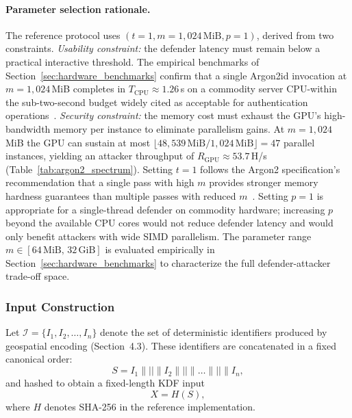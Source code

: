 \documentclass[journal,article,submit,pdftex,moreauthors]{Definitions/mdpi}
\newcommand{\add}[1]{#1}
\newcommand{\add}[1]{\added{#1}}
\begin{document}
\paragraph{Parameter selection rationale.} \add{The reference protocol uses $(t=1, m=1{,}024\,\text{MiB}, p=1)$, derived from two constraints. \emph{Usability constraint:} the defender latency must remain below a practical interactive threshold. The empirical benchmarks of Section~\ref{sec:hardware_benchmarks} confirm that a single Argon2id invocation at $m=1{,}024$\,MiB completes in $T_\text{CPU} \approx 1.26$\,s on a commodity server CPU-within the sub-two-second budget widely cited as acceptable for authentication operations~\cite{nielsen1994usability}. \emph{Security constraint:} the memory cost must exhaust the GPU's high-bandwidth memory per instance to eliminate parallelism gains. At $m=1{,}024$\,MiB the GPU can sustain at most $\lfloor 48{,}539\,\text{MiB} / 1{,}024\,\text{MiB} \rfloor = 47$ parallel instances, yielding an attacker throughput of $R_\text{GPU} \approx 53.7$\,H/s (Table~\ref{tab:argon2_spectrum}). Setting $t=1$ follows the Argon2 specification's recommendation that a single pass with high $m$ provides stronger memory hardness guarantees than multiple passes with reduced $m$~\cite{7467361}. Setting $p=1$ is appropriate for a single-thread defender on commodity hardware; increasing $p$ beyond the available CPU cores would not reduce defender latency and would only benefit attackers with wide SIMD parallelism. The parameter range $m \in [64\,\text{MiB},\, 32\,\text{GiB}]$ is evaluated empirically in Section~\ref{sec:hardware_benchmarks} to characterize the full defender-attacker trade-off space.}

\subsubsection{Input Construction}

Let $\mathcal{I} = \{I_1, I_2, \dots, I_n\}$ denote the set of deterministic identifiers produced by geospatial encoding (Section~4.3). These identifiers are concatenated in a fixed canonical order:
\begin{equation}
S = I_1 \parallel \texttt{||} \parallel I_2 \parallel \texttt{||} \parallel \dots \parallel \texttt{||} \parallel I_n ,
\label{eq:spatial_concat}
\end{equation}
and hashed to obtain a fixed-length KDF input
\begin{equation}
X = H(S),
\label{eq:spatial_hash}
\end{equation}
where $H$ denotes SHA-256 in the reference implementation.
\end{document}
